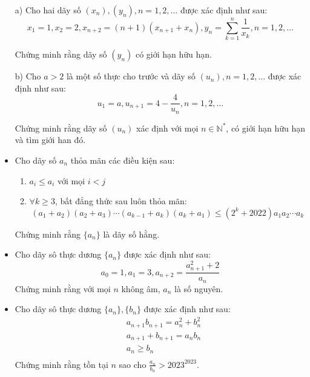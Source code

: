 \documentclass[11pt]{scrartcl}
\begin{document}
\begin{itemize}[label=, leftmargin=0em, itemsep=0.5em]
\begin{btvn}
        a) Cho hai dãy số $\left(x_n\right),\left(y_n\right), n=1,2, \ldots$ được xác định như sau:
        $$
        x_1=1, x_2=2, x_{n+2}=(n+1)\left(x_{n+1}+x_n\right), y_n=\sum_{k=1}^n \frac{1}{x_k}, n=1,2, \ldots
        $$

        Chứng minh rằng dãy số $\left(y_n\right)$ có giới hạn hữu hạn.

        b) Cho $a>2$ là một số thực cho trước và dãy số $\left(u_n\right), n=1,2, \ldots$ được xác định như sau:
        $$
        u_1=a, u_{n+1}=4-\frac{4}{u_n}, n=1,2, \ldots
        $$

        Chứng minh rằng dãy số $\left(u_n\right)$ xác định với mọi $n \in \mathbb{N}^*$, có giới hạn hữu hạn và tìm giới han đó.
    \end{btvn}
    \item \begin{btvn}
        Cho dãy số ${a_n}$ thỏa mãn các điều kiện sau:
        \begin{enumerate}[label=(\alph*)]
            \item$a_i \leq a_i$ với mọi $i < j$
            \item $\forall k \geq 3$, bất đẳng thức sau luôn thỏa mãn:
            $$(a_1+a_2)(a_2+a_3)\cdots(a_{k-1}+a_k)(a_k+a_1)\leq (2^k+2022)a_1a_2\cdots a_k$$
        \end{enumerate}
        Chứng minh rằng $\{a_n\}$ là dãy số hằng.
    \end{btvn}

    \item \begin{btvn}
        Cho dãy sô thực dương $\{ a_n \}$ được xác định như sau:
    \[a_0 = 1, a_1 = 3, a_{n+2} = \frac{a_{n+1}^2+2}{a_n}\]
    Chứng minh rằng với mọi $n$ không âm, $a_n$ là số nguyên.
    \end{btvn}
 
    \item \begin{btvn}
        Cho dãy sô thực dương $\{ a_n \}, \{b_n\}$ được xác định như sau:
        \[
            \begin{aligned}
                &a_{n+1}b_{n+1}= a_n^2 + b_n^2\\
                &a_{n+1}+b_{n+1}=a_nb_n\\
                &a_n \geq b_n\\
            \end{aligned}
        \]
        Chứng minh rằng tồn tại $n$ sao cho $\frac{a_n}{b_n} > 2023^{2023}$.
    \end{btvn}


\end{itemize}
\end{document}
